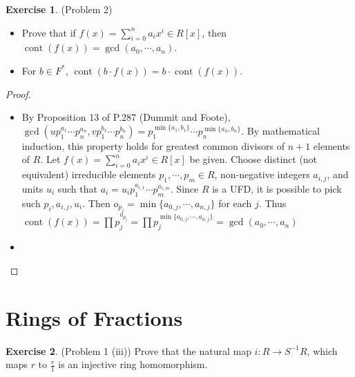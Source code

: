\documentclass[12pt, psamsfonts]{amsart}
\theoremstyle{definition}
\newtheorem*{exer}{Exercise}
\theoremstyle{remark}
\DeclareMathOperator{\cont}{cont}
\numberwithin{equation}{section}
\begin{document}
\begin{exer}{(Problem 2)}
  $ $
  \begin{itemize}
    \item
      Prove that if $f(x) = \sum_{i=0}^{n} a_ix^i \in R[x]$, then $\cont(f(x)) = \gcd(a_0, \cdots, a_n)$.
    \item
      For $b \in F^*$, $\cont(b \cdot f(x)) = b \cdot \cont(f(x))$.
  \end{itemize}
\end{exer}

\begin{proof}
  $ $
  \begin{itemize}
    \item
      By Proposition 13 of P.287 (Dummit and Foote), $\gcd(up_1^{a_1} \cdots p_n^{a_n}, vp_1^{b_1} \cdots p_n^{b_n}) = p_1^{\min \{ a_1, b_1 \}} \cdots p_n^{\min \{ a_n, b_n \}}$.
      By mathematical induction, this property holds for greatest common divisors of $n + 1$ elements of $R$.
      Let $f(x) = \sum_{i=0}^{n} a_ix^i \in R[x]$ be given.
      Choose distinct (not equivalent) irreducible elements $p_1, \cdots, p_m \in R$, non-negative integers $a_{i, j}$, and units $u_i$ such that $a_i = u_ip_1^{a_{i, 1}} \cdots p_m^{a_{i, m}}$.
      Since $R$ is a UFD, it is possible to pick such $p_i, a_{i, j}, u_i$.
      Then $o_{p_j} = \min \{ a_{0, j}, \cdots, a_{n, j} \}$ for each $j$.
      Thus $\cont(f(x)) = \prod p_j^{o_{p_j}} = \prod p_j^{\min \{ a_{0, j}, \cdots, a_{n, j} \}} = \gcd(a_0, \cdots, a_n)$
    \item
      \todo[inline]{
      }
  \end{itemize}
\end{proof}

\section{Rings of Fractions}
\begin{exer}{(Problem 1 (iii))}
  Prove that the natural map $i: R \rightarrow S^{-1}R$, which maps $r$ to $\frac{r}{1}$ is an injective ring homomorphism.
\end{exer}
\end{document}
